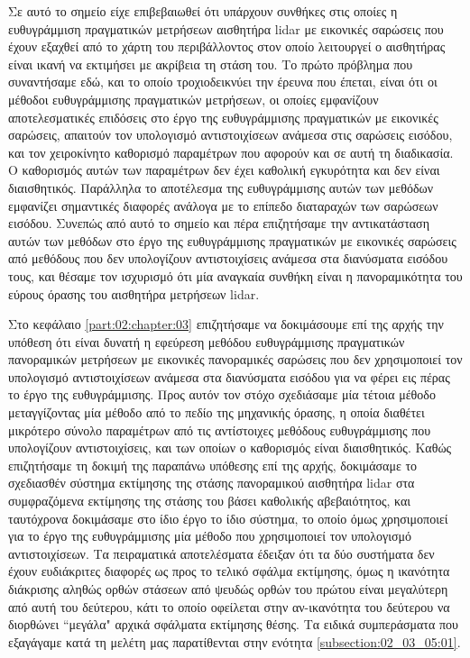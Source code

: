 Σε αυτό το σημείο είχε επιβεβαιωθεί ότι υπάρχουν συνθήκες στις οποίες η
ευθυγράμμιση πραγματικών μετρήσεων αισθητήρα lidar με εικονικές σαρώσεις που
έχουν εξαχθεί από το χάρτη του περιβάλλοντος στον οποίο λειτουργεί ο αισθητήρας
είναι ικανή να εκτιμήσει με ακρίβεια τη στάση του. Το πρώτο πρόβλημα που
συναντήσαμε εδώ, και το οποίο τροχιοδεικνύει την έρευνα που έπεται, είναι ότι
οι μέθοδοι ευθυγράμμισης πραγματικών μετρήσεων, οι οποίες εμφανίζουν
αποτελεσματικές επιδόσεις στο έργο της ευθυγράμμισης πραγματικών με εικονικές
σαρώσεις, απαιτούν τον υπολογισμό αντιστοιχίσεων ανάμεσα στις σαρώσεις εισόδου,
και τον χειροκίνητο καθορισμό παραμέτρων που αφορούν και σε αυτή τη διαδικασία.
Ο καθορισμός αυτών των παραμέτρων δεν έχει καθολική εγκυρότητα και δεν είναι
διαισθητικός. Παράλληλα το αποτέλεσμα της ευθυγράμμισης αυτών των μεθόδων
εμφανίζει σημαντικές διαφορές ανάλογα με το επίπεδο διαταραχών των σαρώσεων
εισόδου. Συνεπώς από αυτό το σημείο και πέρα επιζητήσαμε την αντικατάσταση
αυτών των μεθόδων στο έργο της ευθυγράμμισης πραγματικών με εικονικές σαρώσεις
από μεθόδους που δεν υπολογίζουν αντιστοιχίσεις ανάμεσα στα διανύσματα εισόδου
τους, και θέσαμε τον ισχυρισμό ότι μία αναγκαία συνθήκη είναι η πανοραμικότητα
του εύρους όρασης του αισθητήρα μετρήσεων lidar.

Στο κεφάλαιο \ref{part:02:chapter:03} επιζητήσαμε να δοκιμάσουμε επί της αρχής
την υπόθεση ότι είναι δυνατή η εφεύρεση μεθόδου ευθυγράμμισης πραγματικών
πανοραμικών μετρήσεων με εικονικές πανοραμικές σαρώσεις που δεν χρησιμοποιεί
τον υπολογισμό αντιστοιχίσεων ανάμεσα στα διανύσματα εισόδου για να φέρει εις
πέρας το έργο της ευθυγράμμισης. Προς αυτόν τον στόχο σχεδιάσαμε μία τέτοια
μέθοδο μεταγγίζοντας μία μέθοδο από το πεδίο της μηχανικής όρασης, η οποία
διαθέτει μικρότερο σύνολο παραμέτρων από τις αντίστοιχες μεθόδους ευθυγράμμισης
που υπολογίζουν αντιστοιχίσεις, και των οποίων ο καθορισμός είναι διαισθητικός.
Καθώς επιζητήσαμε τη δοκιμή της παραπάνω υπόθεσης επί της αρχής, δοκιμάσαμε το
σχεδιασθέν σύστημα εκτίμησης της στάσης πανοραμικού αισθητήρα lidar στα
συμφραζόμενα εκτίμησης της στάσης του βάσει καθολικής αβεβαιότητος, και
ταυτόχρονα δοκιμάσαμε στο ίδιο έργο το ίδιο σύστημα, το οποίο όμως χρησιμοποιεί
για το έργο της ευθυγράμμισης μία μέθοδο που χρησιμοποιεί τον υπολογισμό
αντιστοιχίσεων. Τα πειραματικά αποτελέσματα έδειξαν ότι τα δύο συστήματα δεν
έχουν ευδιάκριτες διαφορές ως προς το τελικό σφάλμα εκτίμησης, όμως η ικανότητα
διάκρισης αληθώς ορθών στάσεων από ψευδώς ορθών του πρώτου είναι μεγαλύτερη από
αυτή του δεύτερου, κάτι το οποίο οφείλεται στην αν-ικανότητα του δεύτερου να
διορθώνει ``μεγάλα" αρχικά σφάλματα εκτίμησης θέσης. Τα ειδικά συμπεράσματα που
εξαγάγαμε κατά τη μελέτη μας παρατίθενται στην ενότητα
\ref{subsection:02_03_05:01}.


